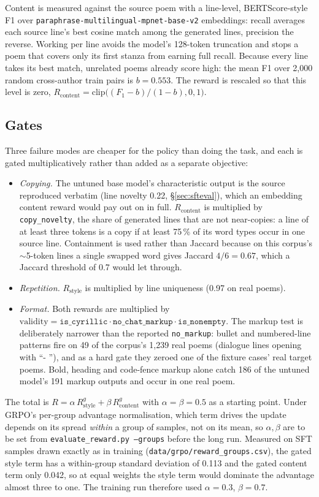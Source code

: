\documentclass[11pt]{article}
\begin{document}
Content is measured against the source poem with a line-level,
BERTScore-style F1 over \texttt{paraphrase-multilingual-mpnet-base-v2}
embeddings: recall averages each source line's best cosine match among the
generated lines, precision the reverse. Working per line avoids the model's
128-token truncation and stops a poem that covers only its first stanza from
earning full recall. Because every line takes its best match, unrelated
poems already score high: the mean F1 over 2,000 random cross-author train
pairs is $b=0.553$. The reward is rescaled so that this level is zero,
$R_{\mathrm{content}}=\mathrm{clip}\big((F_1-b)/(1-b),0,1\big)$.

\subsection{Gates}

Three failure modes are cheaper for the policy than doing the task, and each
is gated multiplicatively rather than added as a separate objective:
\begin{itemize}
  \item \emph{Copying.} The untuned base model's characteristic output is the
    source reproduced verbatim (line novelty 0.22, \S\ref{sec:sfteval}),
    which an embedding content reward would pay out on in full.
    $R_{\mathrm{content}}$ is multiplied by \texttt{copy\_novelty}, the share
    of generated lines that are not near-copies: a line of at least three
    tokens is a copy if at least 75\,\% of its word types occur in one source
    line. Containment is used rather than Jaccard because on this corpus's
    $\sim$5-token lines a single swapped word gives Jaccard $4/6=0.67$, which
    a Jaccard threshold of 0.7 would let through.
  \item \emph{Repetition.} $R_{\mathrm{style}}$ is multiplied by line
    uniqueness (0.97 on real poems).
  \item \emph{Format.} Both rewards are multiplied by
    $\mathrm{validity}=\texttt{is\_cyrillic}\cdot\texttt{no\_chat\_markup}\cdot\texttt{is\_nonempty}$.
    The markup test is deliberately narrower than the reported
    \texttt{no\_markup}: bullet and numbered-line patterns fire on 49 of the
    corpus's 1,239 real poems (dialogue lines opening with ``- ''), and as a
    hard gate they zeroed one of the fixture cases' real target poems. Bold,
    heading and code-fence markup alone catch 186 of the untuned model's 191
    markup outputs and occur in one real poem.
\end{itemize}
The total is
$R=\alpha\,R_{\mathrm{style}}^{g}+\beta\,R_{\mathrm{content}}^{g}$ with
$\alpha=\beta=0.5$ as a starting point. Under GRPO's per-group advantage
normalisation, which term drives the update depends on its spread
\emph{within} a group of samples, not on its mean, so $\alpha,\beta$ are to
be set from \texttt{evaluate\_reward.py --groups} before the long run.
Measured on SFT samples drawn exactly as in training
(\texttt{data/grpo/reward\_groups.csv}), the gated style term has a
within-group standard deviation of 0.113 and the gated content term only
0.042, so at equal weights the style term would dominate the advantage almost
three to one. The training run therefore used $\alpha=0.3$, $\beta=0.7$.
\end{document}
